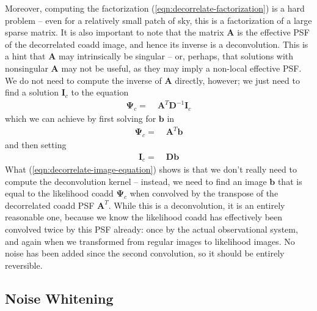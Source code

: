 \documentclass[10pt]{article}
\newcommand{\eqnref}[1]{(\ref{eqn:#1})}
\begin{document}
Moreover, computing the factorization \eqnref{decorrelate-factorization} is a hard problem -- even for a relatively small patch of sky, this is a factorization of a large sparse matrix.  It is also important to note that the matrix $\bm{A}$ is the effective PSF of the decorrelated coadd image, and hence its inverse is a deconvolution.  This is a hint that $\bm{A}$ may intrinsically be singular -- or, perhaps, that solutions with nonsingular $\bm{A}$ may not be useful, as they may imply a non-local effective PSF.  We do not need to compute the inverse of $\bm{A}$ directly, however; we just need to find a solution $\bm{I}_c$ to the equation
\begin{align}
\bm{\Psi}_c =\;& \bm{A}^{T}\bm{D}^{-1}\bm{I}_c
\end{align}
which we can achieve by first solving for $\bm{b}$ in
\begin{align}
\bm{\Psi}_c =\;& \bm{A}^{T}\bm{b}
\label{eqn:decorrelate-image-equation}
\end{align}
and then setting
\begin{align}
\bm{I}_c =\;& \bm{D}\bm{b}
\end{align}
What \eqnref{decorrelate-image-equation} shows is that we don't really need to compute the deconvolution kernel -- instead, we need to find an image $\bm{b}$ that is equal to the likelihood coadd $\bm{\Psi}_c$ when convolved by the transpose of the decorrelated coadd PSF $\bm{A}^T$.  While this is a deconvolution, it is an entirely reasonable one, because we know the likelihood coadd has effectively been convolved twice by this PSF already: once by the actual observational system, and again when we transformed from regular images to likelihood images.  No noise has been added since the second convolution, so it should be entirely reversible.

\subsection{Noise Whitening}
\label{sec:whitening}
\end{document}
